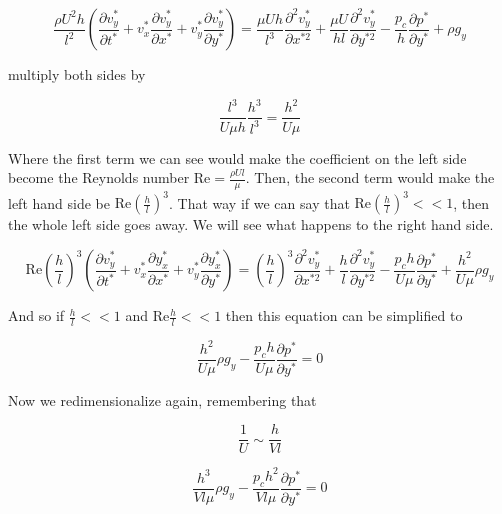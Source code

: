 \begin{equation*}
  \frac{\rho{}U^{2}h}{l^{2}}\left(\frac{\partial{}v_{y}^{*}}{\partial{}t^{*} }+v_{x}^{*}\frac{\partial{}v_{y}^{*}}{\partial{}x^{*}}+v_{y}^{*}\frac{\partial{}v_{y}^{*}}{\partial{}y^{*}}\right)=\frac{\mu{}Uh}{l^{3}}\frac{\partial^{2}v_{y}^{*}}{\partial{}x^{*2}}+\frac{\mu{}U}{hl}\frac{\partial^{2}v_{y}^{*}}{\partial{}y^{*2}}-\frac{p_{c}}{h}\frac{\partial{}p^{*}}{\partial{}y^{*}}+\rho{}g_{y}
\end{equation*}

multiply both sides by

\begin{equation*}
  \frac{l^{3}}{U\mu{}h}\frac{h^{3}}{l^{3}}=\frac{h^{2}}{U\mu}
\end{equation*}

Where the first term we can see would make the coefficient on the left side become the Reynolds number $\text{Re}=\frac{\rho{}Ul}{\mu}$.
Then, the second term would make the left hand side be $\text{Re}\left(\frac{h}{l}\right)^{3}$.
That way if we can say that $\text{Re}\left(\frac{h}{l}\right)^{3}<<1$, then the whole left side goes away.
We will see what happens to the right hand side.

\begin{equation*}
  \text{Re}\left(\frac{h}{l}\right)^{3}\left(\frac{\partial{}v_{y}^{*}}{\partial{}t^{*} }+v_{x}^{*}\frac{\partial{}y_{x}^{*}}{\partial{}x^{*}}+v_{y}^{*}\frac{\partial{}y_{x}^{*}}{\partial{}y^{*}}\right)=\left(\frac{h}{l}\right)^{3}\frac{\partial^{2}v_{y}^{*}}{\partial{}x^{*2}}+\frac{h}{l}\frac{\partial^{2}v_{y}^{*}}{\partial{}y^{*2}}-\frac{p_{c}h}{U\mu}\frac{\partial{}p^{*}}{\partial{}y^{*}}+\frac{h^{2}}{U\mu}\rho{}g_{y}
\end{equation*}

And so if $\frac{h}{l}<<1$ and $\text{Re}\frac{h}{l}<<1$ then this equation can be simplified to

\begin{equation*}
  \frac{h^{2}}{U\mu}\rho{}g_{y}-\frac{p_{c}h}{U\mu}\frac{\partial{}p^{*}}{\partial{}y^{*}}=0
\end{equation*}

Now we redimensionalize again, remembering that

\begin{equation*}
  \frac{1}{U}\sim\frac{h}{Vl}
\end{equation*}

\begin{equation*}
  \frac{h^{3}}{Vl\mu}\rho{}g_{y}-\frac{p_{c}h^{2}}{Vl\mu}\frac{\partial{}p^{*}}{\partial{}y^{*}}=0
\end{equation*}


